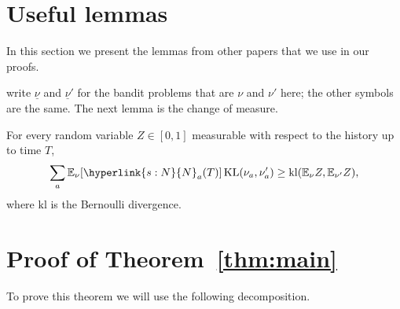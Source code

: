 \documentclass[11pt]{article}
\newcommand{\E}{\mathbb{E}}
\newcommand{\KL}{\mathrm{KL}}
\newcommand{\kl}{\mathrm{kl}}
\newcommand{\sy}[2]{\hyperlink{#1}{#2}}
\newcommand{\N}{\sy{s:N}{N}}
\begin{document}
\appendix

\section{Useful lemmas}\label{sec:cited}

In this section we present the lemmas from other papers that we use in our proofs.

\citet{GMS19} write $\underline{\nu}$ and $\underline{\nu}'$ for the bandit problems that are $\nu$
and $\nu'$ here; the other symbols are the same. The next lemma is the change of measure.

\begin{lemma}\label{cite:GMS19-6}
For every random variable $Z \in [0,1]$ measurable with respect to the history up to time $T$,
\begin{equation*}
  \sum_a \E_\nu[\N_a(T)]\,\KL(\nu_a, \nu'_a) \ge \kl(\E_\nu Z, \E_{\nu'} Z),
\end{equation*}
where $\kl$ is the Bernoulli divergence.
\end{lemma}


\section{Proof of Theorem~\ref{thm:main}}\label{sec:proofs}

To prove this theorem we will use the following decomposition.
\end{document}

